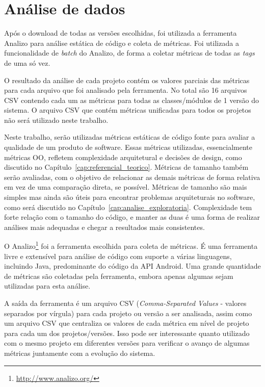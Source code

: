 \section{Análise de dados}

Após o download de todas as versões escolhidas, foi utilizada a ferramenta Analizo para análise estática de código e coleta de métricas. Foi utilizada a funcionalidade de \textit{batch} do Analizo, de forma a coletar métricas de todas as \textit{tags} de uma só vez. 

O resultado da análise de cada projeto contém os valores parciais das métricas para cada arquivo que foi analisado pela ferramenta. No total são 16 arquivos CSV contendo cada um as métricas para todas as classes/módulos de 1 versão do sistema. O arquivo CSV que contém métricas unificadas para todos os projetos não será utilizado neste trabalho. 

Neste trabalho, serão utilizadas métricas estáticas de código fonte para avaliar a qualidade de um produto de software. Essas métricas utilizadas, essencialmente métricas OO, refletem complexidade arquitetural e decisões de design, como discutido no Capítulo~\ref{cap:referencial_teorico}. Métricas de tamanho também serão avaliadas, com o objetivo de relacionar as demais métricas de forma relativa em vez de uma comparação direta, se possível. Métricas de tamanho são mais simples mas ainda são úteis para encontrar problemas arquiteturais no software, como será discutido no Capítulo~\ref{cap:analise_exploratoria}. Complexidade tem forte relação com o tamanho do código, e manter as duas é uma forma de realizar análises mais adequadas e chegar a resultados mais consistentes.

O Analizo\footnote{\url{http://www.analizo.org/}} foi a ferramenta escolhida para coleta de métricas. É uma ferramenta livre e extensível para análise de código com suporte a várias linguagens, incluindo Java, predominante do código da API Android. Uma grande quantidade de métricas são coletadas pela ferramenta, embora apenas algumas sejam utilizadas para esta análise.

A saída da ferramenta é um arquivo CSV (\textit{Comma-Separated Values} - valores separados por vírgula) para cada projeto ou versão a ser analisada, assim como um arquivo CSV que centraliza os valores de cada métrica em nível de projeto para cada um dos projetos/versões. Isso pode ser interessante quanto utilizado com o mesmo projeto em diferentes versões para verificar o avanço de algumas métricas juntamente com a evolução do sistema.

